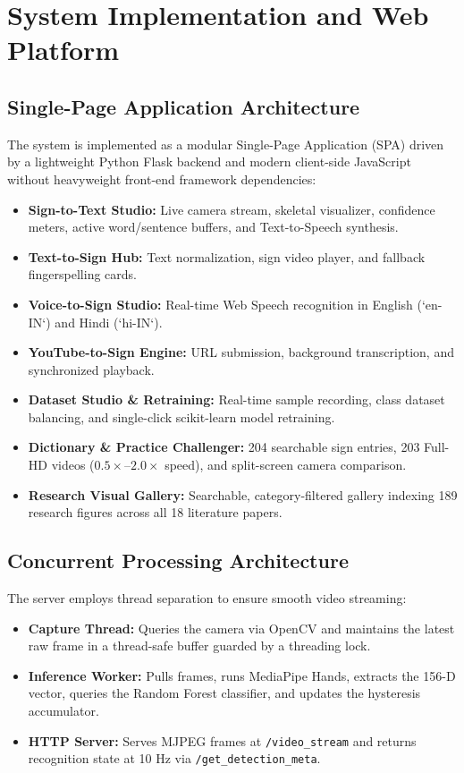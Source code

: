 
\chapter{System Implementation and Web Platform}
\label{Chapter4}

\section{Single-Page Application Architecture}
The system is implemented as a modular Single-Page Application (SPA) driven by a lightweight Python Flask backend and modern client-side JavaScript without heavyweight front-end framework dependencies:
\begin{itemize}
\item \textbf{Sign-to-Text Studio:} Live camera stream, skeletal visualizer, confidence meters, active word/sentence buffers, and Text-to-Speech synthesis.
\item \textbf{Text-to-Sign Hub:} Text normalization, sign video player, and fallback fingerspelling cards.
\item \textbf{Voice-to-Sign Studio:} Real-time Web Speech recognition in English (`en-IN`) and Hindi (`hi-IN`).
\item \textbf{YouTube-to-Sign Engine:} URL submission, background transcription, and synchronized playback.
\item \textbf{Dataset Studio \& Retraining:} Real-time sample recording, class dataset balancing, and single-click scikit-learn model retraining.
\item \textbf{Dictionary \& Practice Challenger:} 204 searchable sign entries, 203 Full-HD videos ($0.5\times$--$2.0\times$ speed), and split-screen camera comparison.
\item \textbf{Research Visual Gallery:} Searchable, category-filtered gallery indexing 189 research figures across all 18 literature papers.
\end{itemize}

\section{Concurrent Processing Architecture}
The server employs thread separation to ensure smooth video streaming:
\begin{itemize}
\item \textbf{Capture Thread:} Queries the camera via OpenCV and maintains the latest raw frame in a thread-safe buffer guarded by a threading lock.
\item \textbf{Inference Worker:} Pulls frames, runs MediaPipe Hands, extracts the 156-D vector, queries the Random Forest classifier, and updates the hysteresis accumulator.
\item \textbf{HTTP Server:} Serves MJPEG frames at \texttt{/video\_stream} and returns recognition state at 10 Hz via \texttt{/get\_detection\_meta}.
\end{itemize}

